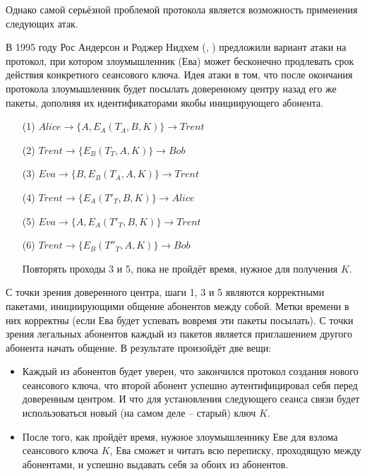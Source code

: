 Однако самой серьёзной проблемой протокола является возможность применения следующих атак.

В 1995 году Рос Андерсон и Роджер Нидхем (, \cite{Anderson:Needham:1995}) предложили вариант атаки на протокол, при котором злоумышленник (Ева) может бесконечно продлевать срок действия конкретного сеансового ключа. Идея атаки в том, что после окончания протокола злоумышленник будет посылать доверенному центру назад его же пакеты, дополняя их идентификаторами якобы инициирующего абонента.

\begin{samepage}\begin{itemize}
	\item[(1)] $Alice \to \{ A, E_A \left( T_A, B, K \right) \} \to Trent$
	\item[(2)] $Trent \to \{ E_B \left( T_T, A, K \right) \} \to Bob$
	\item[(3)] $Eva \to \{ B, E_B \left( T_A, A, K \right) \} \to Trent$
	\item[(4)] $Trent \to \{ E_A \left( T'_T, B, K \right) \} \to Alice$
	\item[(5)] $Eva \to \{ A, E_A \left( T'_T, B, K \right) \} \to Trent$
	\item[(6)] $Trent \to \{ E_B \left( T''_T, A, K \right) \} \to Bob$
	\item[{}] Повторять проходы 3 и 5, пока не пройдёт время, нужное для получения $K$.
\end{itemize}\end{samepage}

С точки зрения доверенного центра, шаги 1, 3 и 5 являются корректными пакетами, инициирующими общение абонентов между собой. Метки времени в них корректны (если Ева будет успевать вовремя эти пакеты посылать). С точки зрения легальных абонентов каждый из пакетов является приглашением другого абонента начать общение. В результате произойдёт две вещи:

\begin{itemize}
	\item Каждый из абонентов будет уверен, что закончился протокол создания нового сеансового ключа, что второй абонент успешно аутентифицировал себя перед доверенным центром. И что для установления следующего сеанса связи будет использоваться новый (на самом деле -- старый) ключ $K$.
	\item После того, как пройдёт время, нужное злоумышленнику Еве для взлома сеансового ключа $K$, Ева сможет и читать всю переписку, проходящую между абонентами, и успешно выдавать себя за обоих из абонентов.
\end{itemize}

